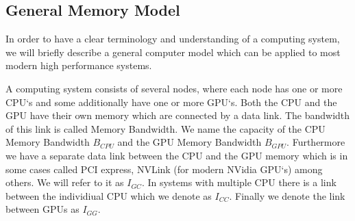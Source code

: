 \documentclass[]{article}
\begin{document}
\subsection{General Memory Model}

In order to have a clear terminology and understanding of a computing system, we will briefly describe a general computer model which can be applied to most modern high performance systems.

A computing system consists of several nodes, where each node has one or more CPU`s and some additionally have one or more GPU`s. Both the CPU and the GPU have their own memory which are connected by a data link. The bandwidth of this link is called Memory Bandwidth. We name the capacity of the CPU Memory Bandwidth $B_{CPU}$ and the GPU Memory Bandwidth $B_{GPU}$. Furthermore we have a separate data link between the CPU and the GPU memory which is in some cases called PCI express, NVLink (for modern NVidia GPU`s) among others. We will refer to it as $I_{GC}$. In systems with multiple CPU there is a link between the individiual CPU which we denote as $I_{CC}$. Finally we denote the link between GPUs as $I_{GG}$.
\end{document}
